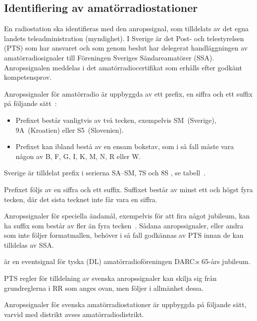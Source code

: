 \subsection{Identifiering av amatörradiostationer}

En radiostation ska identifieras med den anropssignal, som tilldelats av det
egna landets teleadministration (myndighet).
I Sverige är det Post- och telestyrelsen (PTS) som har ansvaret och som genom
beslut har delegerat handläggningen av amatörradiosignaler till Föreningen
Sveriges Sändareamatörer (SSA).
Anropssignalen meddelas i det amatörradiocertifikat som erhålls efter godkänt
kompetensprov.

Anropssignaler för amatörradio är uppbyggda av ett prefix, en siffra och ett
suffix på följande sätt~\cite[\S19.68, \S19.69]{ITU-RR}:

\begin{itemize}
\item Prefixet består vanligtvis av två tecken, exempelvis SM~(Sverige), 9A~(Kroatien)
eller S5~(Slovenien).
\item Prefixet kan ibland bestå av en ensam bokstav, som i så fall måste vara någon
av B, F, G, I, K, M, N, R eller W.
\end{itemize}

Sverige är tilldelat prefix i serierna SA--SM, 7S och 8S
\cite[Appendix 42]{ITU-RR}, se tabell~.

Prefixet följs av en siffra och ett suffix. Suffixet består av minst ett och
högst fyra tecken, där det sista tecknet inte får vara en siffra.

Anropssignaler för speciella ändamål, exempelvis för att fira något jubileum,
kan ha suffix som består av fler än fyra tecken~\cite[\S19.68A]{ITU-RR}.
Sådana anropssignaler, eller andra som inte följer formatmallen, behöver i så
fall godkännas av PTS innan de kan tilldelas av SSA.

\begin{exempelbox}
 är en eventsignal för tyska (DL) amatörradioföreningen
DARC:s 65-års jubileum.
\end{exempelbox}

PTS regler för tilldelning av svenska anropssignaler kan skilja sig från
grundreglerna i RR som anges ovan, men följer i allmänhet dessa.

Anropssignaler för svenska amatörradiostationer är uppbyggda på följande
sätt, varvid med distrikt avses amatörradiodistrikt.

